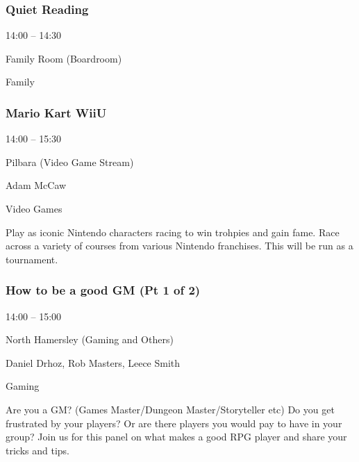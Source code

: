 \documentclass{scrreprt}
\begin{document}
\begin{multicols}{2}
\subsubsection*{Quiet Reading}\begin{description}
\setlength{\itemsep}{0pt}
\setlength{\parsep}{0pt}
\setlength{\parskip}{0pt}
\item[Time:]{14:00 -- 14:30}
\item[Venue:]{Family Room (Boardroom)}
\item[Tags:]{Family}\end{description}

\subsubsection*{Mario Kart WiiU}\begin{description}
\setlength{\itemsep}{0pt}
\setlength{\parsep}{0pt}
\setlength{\parskip}{0pt}
\item[Time:]{14:00 -- 15:30}
\item[Venue:]{Pilbara (Video Game Stream)}
\item[People:]{Adam McCaw}
\item[Tags:]{Video Games}\end{description}
Play as iconic Nintendo characters racing to win trohpies and gain fame. Race across a variety of courses from various Nintendo franchises. This will be run as a tournament.
\subsubsection*{How to be a good GM (Pt 1 of 2)}\begin{description}
\setlength{\itemsep}{0pt}
\setlength{\parsep}{0pt}
\setlength{\parskip}{0pt}
\item[Time:]{14:00 -- 15:00}
\item[Venue:]{North Hamersley (Gaming and Others)}
\item[People:]{Daniel Drhoz, Rob Masters, Leece Smith}
\item[Tags:]{Gaming}\end{description}
Are you a GM? (Games Master/Dungeon Master/Storyteller etc) Do you get frustrated by your players? Or are there players you would pay to have in your group? Join us for this panel on what makes a good RPG player and share your tricks and tips.

\end{multicols}
\end{document}
